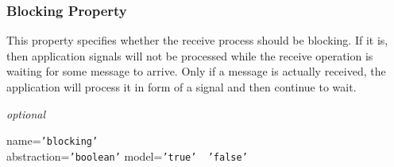 \subsubsection{Blocking Property}

This property specifies whether the receive process should be blocking. If it
is, then application signals will not be processed while the receive operation
is waiting for some message to arrive. Only if a message is actually received,
the application will process it in form of a signal and then continue to wait.

\emph{optional}

name=\texttt{'blocking'}\\
abstraction=\texttt{'boolean'}
model=\texttt{'true' \vline\ 'false'}
